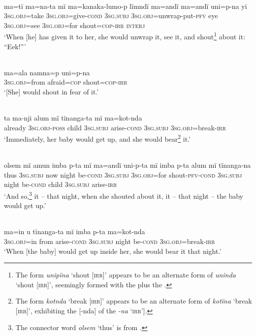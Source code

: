 \\
\gll ma=tï      ma=na-ta        mï      ma=kanaka-lumo-p lïmndï  ma=andï    ma=andï    uni=p-na      yi\\
3\textsc{sg.obj}=take  3\textsc{sg.obj}=give-\textsc{cond}  3\textsc{sg.subj}  3\textsc{sg.obj}=unwrap-put-\textsc{pfv} eye    3\textsc{sg.obj}=see  3\textsc{sg.obj}=for  shout=\textsc{cop}{}-\textsc{irr}  \textsc{interj}\\
\glt ‘When [he] has given it to her, she would unwrap it, see it, and shout\footnote{The form \textit{unipïna} ‘shout [\textsc{irr]}’ appears to be an alternate form of \textit{uninda} ‘shout [\textsc{irr]}’, seemingly formed with the  plus the  .} about it: “Eek!”’

\\
\gll ma=ala    namna=p    uni=p-na\\
3\textsc{sg.obj=}from  afraid=\textsc{cop}  shout=\textsc{cop}{}-\textsc{irr}\\
\glt ‘[She] would shout in fear of it.’

\\
\gll ta    ma-nji      alum  mï      tïnanga-ta     mï ma=kot-nda\\
already  3\textsc{sg.obj-poss}  child  3\textsc{sg.subj}  arise-\textsc{cond}  3\textsc{sg.subj} 3\textsc{sg.obj}=break-\textsc{irr}\\
\glt ‘Immediately, her baby would get up, and she would bear\footnote{The form \textit{kotnda} ‘break [\textsc{irr}]’ appears to be an alternate form of \textit{kotïna} ‘break [\textsc{irr}]’, exhibiting the  [-nda] of the   \textit{-na} ‘\textsc{irr}’].} it.’

\\
\gll olsem  mï      amun  imba  p-ta    mï      ma=andï uni-p-ta      mï      imba  p-ta    alum  mï tïnanga-na\\
thus  3\textsc{sg.subj}  now  night  be-\textsc{cond}  3\textsc{sg.subj}  3\textsc{sg.obj}=for shout-\textsc{pfv-cond}  3\textsc{sg.subj}  night  be-\textsc{cond}  child  3\textsc{sg.subj} arise-\textsc{irr}\\
\glt ‘And so,\footnote{The connector word \textit{olsem} ‘thus’ is from .} it -- that night, when she shouted about it, it -- that night -- the baby would get up.’

\\
\gll ma=in      u    tïnanga-ta    mï      imba  p-ta ma=kot-nda\\
3\textsc{sg.obj}=in  from  arise-\textsc{cond}  3\textsc{sg.subj}  night  be-\textsc{cond} 3\textsc{sg.obj}=break-\textsc{irr}\\
\glt ‘When [the baby] would get up inside her, she would bear it that night.’

\z
